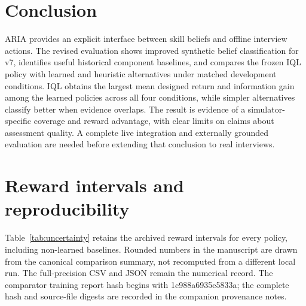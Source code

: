 \documentclass[10pt,a4paper]{article}
\begin{document}
\section{Conclusion}
ARIA provides an explicit interface between skill beliefs and offline interview actions. The revised evaluation shows improved synthetic belief classification for v7, identifies useful historical component baselines, and compares the frozen IQL policy with learned and heuristic alternatives under matched development conditions. IQL obtains the largest mean designed return and information gain among the learned policies across all four conditions, while simpler alternatives classify better when evidence overlaps. The result is evidence of a simulator-specific coverage and reward advantage, with clear limits on claims about assessment quality. A complete live integration and externally grounded evaluation are needed before extending that conclusion to real interviews.

\appendix
\section{Reward intervals and reproducibility}
Table~\ref{tab:uncertainty} retains the archived reward intervals for every policy, including non-learned baselines. Rounded numbers in the manuscript are drawn from the canonical comparison summary, not recomputed from a different local run. The full-precision CSV and JSON remain the numerical record. The comparator training report hash begins with 1c988a6935e5833a; the complete hash and source-file digests are recorded in the companion provenance notes.
\end{document}
